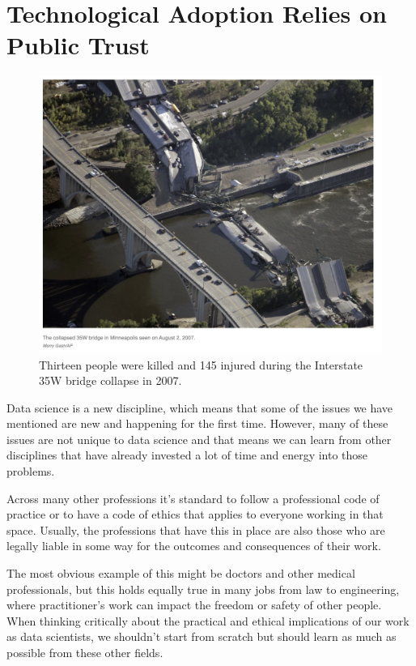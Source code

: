 \documentclass[
  letterpaper,
  DIV=11,
  numbers=noendperiod]{scrreprt}
\begin{document}
\section{Technological Adoption Relies on Public
Trust}\label{technological-adoption-relies-on-public-trust}

\begin{figure}[H]

{\centering \includegraphics[width=4.92in,height=\textheight]{images/503-ethics-conduct/collapsed-bridge.png}

}

\caption{Thirteen people were killed and 145 injured during the
Interstate 35W bridge collapse in 2007.}

\end{figure}%

Data science is a new discipline, which means that some of the issues we
have mentioned are new and happening for the first time. However, many
of these issues are not unique to data science and that means we can
learn from other disciplines that have already invested a lot of time
and energy into those problems.

Across many other professions it's standard to follow a professional
code of practice or to have a code of ethics that applies to everyone
working in that space. Usually, the professions that have this in place
are also those who are legally liable in some way for the outcomes and
consequences of their work.

The most obvious example of this might be doctors and other medical
professionals, but this holds equally true in many jobs from law to
engineering, where practitioner's work can impact the freedom or safety
of other people. When thinking critically about the practical and
ethical implications of our work as data scientists, we shouldn't start
from scratch but should learn as much as possible from these other
fields.
\end{document}
